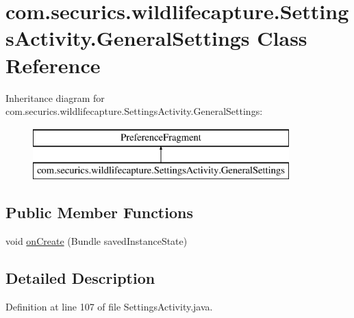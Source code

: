 \hypertarget{classcom_1_1securics_1_1wildlifecapture_1_1_settings_activity_1_1_general_settings}{\section{com.\+securics.\+wildlifecapture.\+Settings\+Activity.\+General\+Settings Class Reference}
\label{classcom_1_1securics_1_1wildlifecapture_1_1_settings_activity_1_1_general_settings}
}
Inheritance diagram for com.\+securics.\+wildlifecapture.\+Settings\+Activity.\+General\+Settings\+:\begin{figure}[H]
\begin{center}
\leavevmode
\includegraphics[height=2.000000cm]{classcom_1_1securics_1_1wildlifecapture_1_1_settings_activity_1_1_general_settings}
\end{center}
\end{figure}
\subsection*{Public Member Functions}
\begin{DoxyCompactItemize}
\item 
void \hyperlink{classcom_1_1securics_1_1wildlifecapture_1_1_settings_activity_1_1_general_settings_ade465d2b180cc7f57a3d50d8bee4d6c9}{on\+Create} (Bundle saved\+Instance\+State)
\end{DoxyCompactItemize}


\subsection{Detailed Description}


Definition at line 107 of file Settings\+Activity.\+java.



